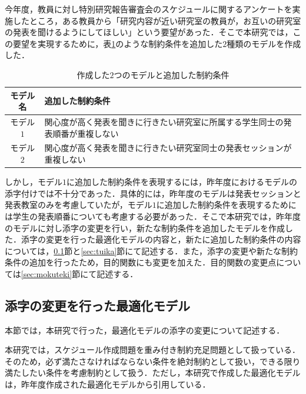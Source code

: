 \documentclass[a4paper,12pt,fleqn]{jarticle}
\begin{document}
今年度，教員に対し特別研究報告審査会のスケジュールに関するアンケートを実施したところ，ある教員から「研究内容が近い研究室の教員が，お互いの研究室の発表を聞けるようにしてほしい」という要望があった．そこで本研究では，この要望を実現するために，表\ref{tb:models}のような制約条件を追加した$2$種類のモデルを作成した．
\begin{table}[H]
  \begin{center}
    \caption{作成した$2$つのモデルと追加した制約条件}
    \label{tb:models}
    \begin{tabular}{c|p{13cm}} \toprule
    モデル名 & 追加した制約条件　\\ \bottomrule
    モデル$1$ & 関心度が高く発表を聞きに行きたい研究室に所属する学生同士の発表順番が重複しない\\
    モデル$2$ & 関心度が高く発表を聞きに行きたい研究室同士の発表セッションが重複しない\\ \bottomrule
    \end{tabular}
  \end{center}
 \end{table}

しかし，モデル$1$に追加した制約条件を表現するには，昨年度におけるモデルの添字付けでは不十分であった．具体的には，昨年度のモデルは発表セッションと発表教室のみを考慮していたが，モデル$1$に追加した制約条件を表現するためには学生の発表順番についても考慮する必要があった．そこで本研究では，昨年度のモデルに対し添字の変更を行い，新たな制約条件を追加したモデルを作成した．添字の変更を行った最適化モデルの内容と，新たに追加した制約条件の内容については，\ref{sec:model}節と\ref{sec:tuika}節にて記述する．また，添字の変更や新たな制約条件の追加を行ったため，目的関数にも変更を加えた．目的関数の変更点については\ref{sec:mokuteki}節にて記述する．


 \subsection{添字の変更を行った最適化モデル}\label{sec:model}
本節では，本研究で行った，最適化モデルの添字の変更について記述する．

本研究では，スケジュール作成問題を重み付き制約充足問題として扱っている．そのため，必ず満たさなければならない条件を絶対制約として扱い，できる限り満たしたい条件を考慮制約として扱う．ただし，本研究で作成した最適化モデルは，昨年度作成された最適化モデルから引用している．
\end{document}
